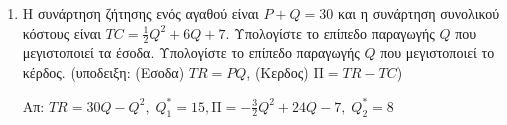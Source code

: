 \begin{enumerate}
  \item Η συνάρτηση ζήτησης ενός αγαθού είναι $ P+Q = 30 $ και η συνάρτηση 
    συνολικού κόστους είναι $ TC = \frac{1}{2} Q^{2} + 6Q + 7 $.
    Υπολογίστε το επίπεδο παραγωγής $ Q $ που μεγιστοποιεί τα έσοδα.
    Υπολογίστε το επίπεδο παραγωγής $ Q $ που μεγιστοποιεί το κέρδος.
    (υποδειξη: (Εσοδα) $TR = PQ$, (Κερδος) $\text{Π} = TR-TC$)

    \hfill Απ: $ TR= 30Q-Q^{2},\; Q_{1}^{*}=15, \text{Π} = - \frac{3}{2} Q^{2} + 
    24Q -7,\; Q_{2}^{*}=8 $ 

\end{enumerate}


